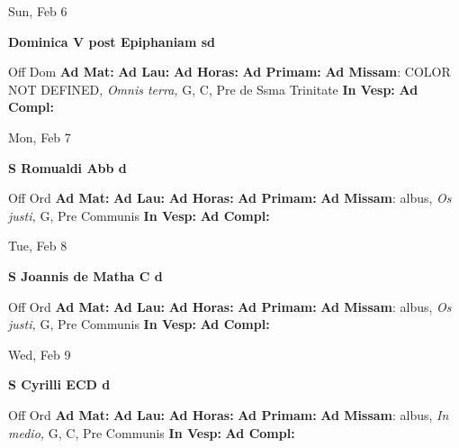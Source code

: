 \documentclass[10pt]{memoir}
\begin{document}
\begin{center}
\begin{minipage}{3.5in}
\vspace{2em}
\begin{center}Sun, Feb 6
\end{center}
\textbf{ \large Dominica V post Epiphaniam
\textnormal{\normalsize sd}}

\begin{justify}Off Dom
\textbf{Ad Mat: }
\textbf{Ad Lau: }
\textbf{Ad Horas: }
\textbf{Ad Primam: }\textbf{Ad Missam}: COLOR NOT DEFINED, \textit{Omnis terra,} G, C, Pre de Ssma Trinitate
\textbf{In Vesp: }
\textbf{Ad Compl: }
\end{justify}
\end{minipage}
\end{center}

\begin{center}
\begin{minipage}{3.5in}
\vspace{2em}
\begin{center}Mon, Feb 7
\end{center}
\textbf{ \large S Romualdi Abb
\textnormal{\normalsize d}}

\begin{justify}Off Ord
\textbf{Ad Mat: }
\textbf{Ad Lau: }
\textbf{Ad Horas: }
\textbf{Ad Primam: }\textbf{Ad Missam}: albus, \textit{Os justi,} G, Pre Communis
\textbf{In Vesp: }
\textbf{Ad Compl: }
\end{justify}
\end{minipage}
\end{center}

\begin{center}
\begin{minipage}{3.5in}
\vspace{2em}
\begin{center}Tue, Feb 8
\end{center}
\textbf{ \large S Joannis de Matha C
\textnormal{\normalsize d}}

\begin{justify}Off Ord
\textbf{Ad Mat: }
\textbf{Ad Lau: }
\textbf{Ad Horas: }
\textbf{Ad Primam: }\textbf{Ad Missam}: albus, \textit{Os justi,} G, Pre Communis
\textbf{In Vesp: }
\textbf{Ad Compl: }
\end{justify}
\end{minipage}
\end{center}

\begin{center}
\begin{minipage}{3.5in}
\vspace{2em}
\begin{center}Wed, Feb 9
\end{center}
\textbf{ \large S Cyrilli ECD
\textnormal{\normalsize d}}

\begin{justify}Off Ord
\textbf{Ad Mat: }
\textbf{Ad Lau: }
\textbf{Ad Horas: }
\textbf{Ad Primam: }\textbf{Ad Missam}: albus, \textit{In medio,} G, C, Pre Communis
\textbf{In Vesp: }
\textbf{Ad Compl: }
\end{justify}
\end{minipage}
\end{center}
\end{document}
